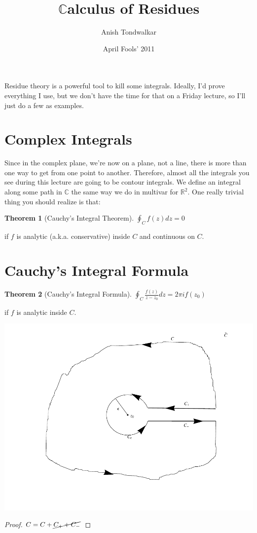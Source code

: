 \documentclass[11pt,notitlepage]{article}
\title{$\mathbb{C}$alculus of Residues}
\author{Anish Tondwalkar}
\date{April Fools' 2011}
\newtheorem{thm}{Theorem}[section]
\begin{document}
\maketitle
Residue theory is a powerful tool to kill some integrals. Ideally, I'd prove everything I use, but we don't have the time for that on a Friday lecture, so I'll just do a few as examples. 
\section{Complex Integrals}
Since in the complex plane, we're now on a plane, not a line, there is more than one way to get from one point to another. Therefore, almost all the integrals you see during this lecture are going to be contour integrals. We define an integral along some path in $\mathbb{C}$ the same way we do in multivar for $\mathbb{R}^2$. One really trivial thing you should realize is that:
\begin{thm}[Cauchy's Integral Theorem]
$\oint_C f(z) dz = 0$ 
\end{thm}
\begin{flushright}
if $f$ is analytic (a.k.a.\! conservative) inside $C$ and continuous on $C$.
\end{flushright}
\section{Cauchy's Integral Formula}
\begin{thm}[Cauchy's Integral Formula]
$\oint_C \frac{f(z)}{z-z_0} dz = 2 \pi i f(z_0)$ 
\end{thm}
\begin{flushright}
if $f$ is analytic inside $C$.
\end{flushright}
\includegraphics[scale=.4]{ctwiddle}
\begin{proof}
$C = C + \cancel{C_{+} + C_{-}}$

\end{proof}
\end{document}
